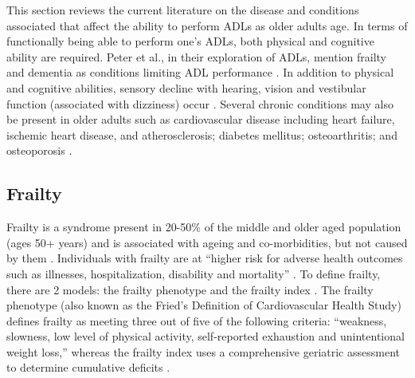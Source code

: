 This section reviews the current literature on the disease and conditions associated that affect the ability to perform ADLs as older adults age. In terms of functionally being able to perform one's ADLs, both physical and cognitive ability are required. Peter et al., in their exploration of ADLs, mention frailty and dementia as conditions limiting ADL performance \cite{edemekong_activities_2022}. In addition to physical and cognitive abilities, sensory decline with hearing, vision and vestibular function (associated with dizziness) occur \cite{jaul_age-related_2017}. Several chronic conditions may also be present in older adults such as cardiovascular disease including heart failure, ischemic heart disease, and atherosclerosis; diabetes mellitus; osteoarthritis; and osteoporosis \cite{jaul_age-related_2017}.


\subsection{Frailty}
Frailty is a syndrome present in 20-50\% of the middle and older aged population (ages 50+ years) \cite{hewitt_prevalence_2018} and is associated with ageing and co-morbidities, but not caused by them \cite{conroy_defining_2009}. Individuals with frailty are at “higher risk for adverse health outcomes such as illnesses, hospitalization, disability and mortality” . To define frailty, there are 2 models: the frailty phenotype and the frailty index \cite{chen_frailty_2014}. The frailty phenotype (also known as the Fried’s Definition of Cardiovascular Health Study) defines frailty as meeting three out of five of the following criteria: “weakness, slowness, low level of physical activity, self-reported exhaustion and unintentional weight loss,” whereas the frailty index uses a comprehensive geriatric assessment to determine cumulative deficits \cite{chen_frailty_2014}. 

